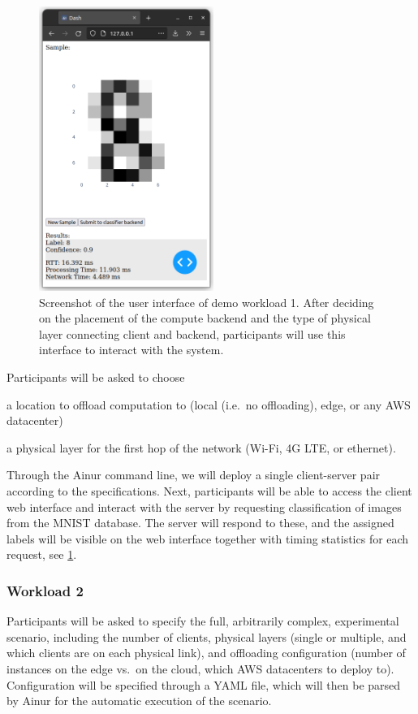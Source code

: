 \begin{figure}
    \centering
    \includegraphics[height=25em]{publications/2022Ainur/figures/demo_mockup}
    \caption{Screenshot of the user interface of demo workload 1. After deciding on the placement of the compute backend and the type of physical layer connecting client and backend, participants will use this interface to interact with the system.}\label{paper:olguinmunoz2022ainur:fig:mockup}
\end{figure}

Participants will be asked to choose
\begin{inlineenum}
    \item a location to offload computation to (local (i.e.\ no offloading), edge, or any \gls{AWS} datacenter)
    \item a physical layer for the first hop of the network (Wi-Fi, 4G \gls{LTE}, or ethernet).
\end{inlineenum}
Through the Ainur command line, we will deploy a single client-server pair according to the specifications.
Next, participants will be able to access the client web interface and interact with the server by requesting classification of images from the \gls{MNIST} database.
The server will respond to these, and the assigned labels will be visible on the web interface together with timing statistics for each request, see \cref{paper:olguinmunoz2022ainur:fig:mockup}.

\subsubsection{Workload 2}

Participants will be asked to specify the full, arbitrarily complex, experimental scenario, including the number of clients, physical layers (single or multiple, and which clients are on each physical link), and offloading configuration (number of instances on the edge vs.\ on the cloud, which \gls{AWS} datacenters to deploy to).
Configuration will be specified through a \gls{YAML} file, which will then be parsed by Ainur for the automatic execution of the scenario.
